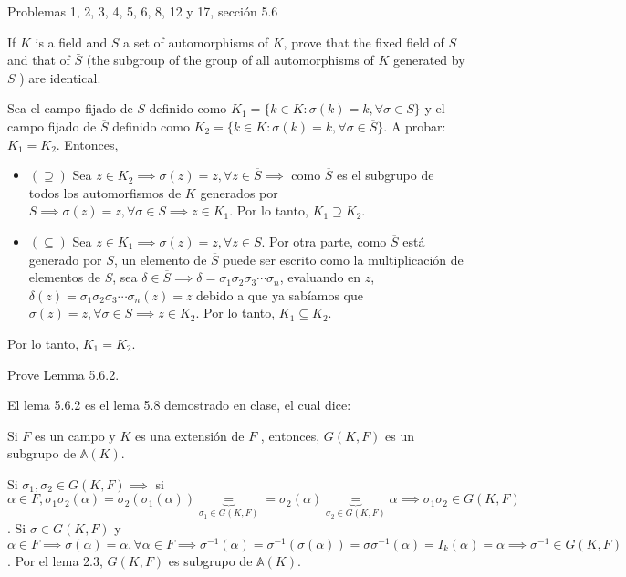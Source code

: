 




Problemas 1, 2, 3, 4, 5, 6, 8, 12 y 17, sección 5.6

\begin{problema}[Problema 1]
    If $K$ is a field and $S$ a set of automorphisms of $K$, prove that the fixed field of $S$ and that of $\bar{S}$ (the subgroup of the group of all automorphisms of $K$ generated by $S$ ) are identical.
    \begin{dem}
        Sea el campo fijado de $S$ definido como $K_1=\{k\in K:\sigma(k)=k,\forall \sigma \in S\}$ y el campo fijado de $\overline{S}$ definido como $K_2=\{k\in K:\sigma(k)=k,\forall \sigma \in \overline{S}\}$. A probar: $K_1=K_2$. Entonces, 
        \begin{itemize}
            \item $(\supseteq)$ Sea $z\in K_2\implies \sigma(z)=z,\forall z\in \overline{S}\implies$ como $\overline{S}$ es el subgrupo de todos los automorfismos de $K$ generados por $S\implies \sigma(z)=z,\forall \sigma\in S\implies z\in K_1$. Por lo tanto, $K_1\supseteq K_2$.
            \item $(\subseteq)$ Sea $z\in K_1\implies \sigma(z)=z,\forall z\in S$. Por otra parte, como $\overline{S}$ está generado por $S$, un elemento de $\overline{S}$ puede ser escrito como la multiplicación de elementos de $S$, sea $\delta\in \overline{S}\implies \delta=\sigma_1\sigma_2\sigma_3\cdots\sigma_n$, evaluando en $z$, $\delta(z)=\sigma_1\sigma_2\sigma_3\cdots\sigma_n(z)=z$ debido a que ya sabíamos que $\sigma(z)=z,\forall \sigma \in S\implies z\in K_2$. Por lo tanto, $K_1\subseteq K_2$.
        \end{itemize}
        Por lo tanto, $K_1=K_2$.
    \end{dem}
\end{problema}

\begin{problema}[Problema 2]
    Prove Lemma 5.6.2.\bigbreak
    
        El lema 5.6.2 es el lema 5.8 demostrado en clase, el cual dice:

        \begin{center}
            Si $F$ es un campo y $K$ es una extensión de $F$ , entonces, $G(K, F )$ es un subgrupo de $\mathbb{A}(K)$.
        \end{center}
    \begin{dem}
        Si $\sigma_1,\sigma_2\in G(K,F)\implies$ si $\alpha\in F,\sigma_1\sigma_2(\alpha)=\sigma_2(\sigma_1(\alpha))\underbrace{=}_{\sigma_1\in G(K,F)}=\sigma_2(\alpha)\underbrace{=}_{\sigma_2\in G(K,F)}\alpha\implies \sigma_1\sigma_2\in G(K,F)$. Si $\sigma\in G(K,F)$ y $\alpha\in F\implies \sigma(\alpha)=\alpha,\forall \alpha\in F\implies \sigma^{-1}(\alpha)=\sigma^{-1}(\sigma(\alpha))=\sigma\sigma^{-1}(\alpha)=I_k(\alpha)=\alpha\implies \sigma^{-1}\in G(K,F)$. Por el lema 2.3, $G(K,F)$ es subgrupo de $\mathbb{A}(K)$.
    \end{dem}
\end{problema}


